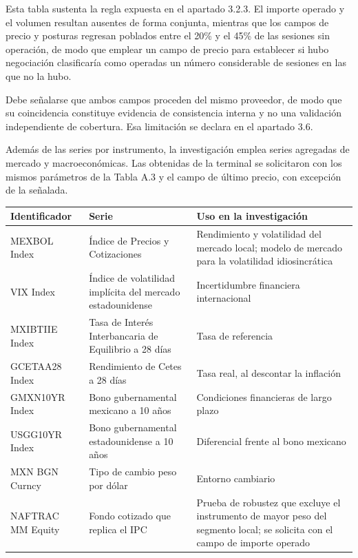 Esta tabla sustenta la regla expuesta en el apartado 3.2.3. El importe operado y el volumen resultan ausentes de forma conjunta, mientras que los campos de precio y posturas regresan poblados entre el 20\% y el 45\% de las sesiones sin operación, de modo que emplear un campo de precio para establecer si hubo negociación clasificaría como operadas un número considerable de sesiones en las que no la hubo.

Debe señalarse que ambos campos proceden del mismo proveedor, de modo que su coincidencia constituye evidencia de consistencia interna y no una validación independiente de cobertura. Esa limitación se declara en el apartado 3.6.


Además de las series por instrumento, la investigación emplea series agregadas de mercado y macroeconómicas. Las obtenidas de la terminal se solicitaron con los mismos parámetros de la Tabla A.3 y el campo de último precio, con excepción de la señalada.

{\small
\begin{longtable}[]{@{}
  >{\raggedright\arraybackslash}p{}
  >{\raggedright\arraybackslash}p{}
  >{\raggedright\arraybackslash}p{}@{}}
\toprule\noalign{}
\begin{minipage}[b]{\linewidth}\raggedright
\textbf{Identificador}
\end{minipage} & \begin{minipage}[b]{\linewidth}\raggedright
\textbf{Serie}
\end{minipage} & \begin{minipage}[b]{\linewidth}\raggedright
\textbf{Uso en la investigación}
\end{minipage} \\
\midrule\noalign{}
\endhead
\bottomrule\noalign{}
\endlastfoot
MEXBOL Index & Índice de Precios y Cotizaciones & Rendimiento y volatilidad del mercado local; modelo de mercado para la volatilidad idiosincrática \\
VIX Index & Índice de volatilidad implícita del mercado estadounidense & Incertidumbre financiera internacional \\
MXIBTIIE Index & Tasa de Interés Interbancaria de Equilibrio a 28 días & Tasa de referencia \\
GCETAA28 Index & Rendimiento de Cetes a 28 días & Tasa real, al descontar la inflación \\
GMXN10YR Index & Bono gubernamental mexicano a 10 años & Condiciones financieras de largo plazo \\
USGG10YR Index & Bono gubernamental estadounidense a 10 años & Diferencial frente al bono mexicano \\
MXN BGN Curncy & Tipo de cambio peso por dólar & Entorno cambiario \\
NAFTRAC MM Equity & Fondo cotizado que replica el IPC & Prueba de robustez que excluye el instrumento de mayor peso del segmento local; se solicita con el campo de importe operado \\
\end{longtable}
}

